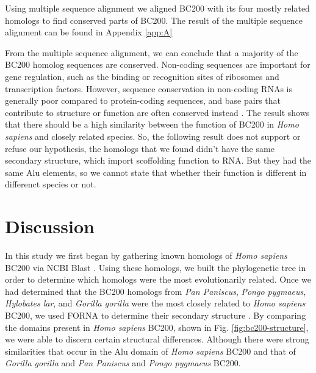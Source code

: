\documentclass[conference, 11pt]{IEEEtran}
\begin{document}
{Using multiple sequence alignment we aligned BC200 with its four mostly related homologs to find conserved parts of BC200. 
The result of the multiple sequence alignment can be found in Appendix \ref{app:A}

From the multiple sequence alignment, we can conclude that a majority of the BC200 homolog sequences are conserved. 
Non-coding sequences are important for gene regulation, such as the binding or recognition sites of ribosomes and transcription factors. 
However, sequence conservation in non-coding RNAs is generally poor compared to protein-coding sequences, and base pairs that contribute to structure or function are often conserved instead \cite{johnsson2014evolutionary}. 
The result shows that there should be a high similarity between the function of BC200 in \emph{Homo sapiens} and closely related species. 
So, the following result does not support or refuse our hypothesis, the homologs that we found didn't have the same secondary structure, which import scoffolding function to RNA. But they had the same Alu elements, so we cannot state that whether their function is different in differenct species or not. 

\section{Discussion}\label{sec:discussion}

In this study we first began by gathering known homologs of \emph{Homo sapiens} BC200 via NCBI Blast \cite{blastTool,madden2012blast}. 
Using these homologs, we built the phylogenetic tree in order to determine which homologs were the most evolutionarily related. 
Once we had determined that the BC200 homologs from \emph{Pan Paniscus}, \emph{Pongo pygmaeus}, \emph{Hylobates lar}, and \emph{Gorilla gorilla} were the most closely related to \emph{Homo sapiens} BC200, we used FORNA to determine their secondary structure \cite{lorenz2011viennarna}. 
By comparing the domains present in \emph{Homo sapiens} BC200, shown in Fig. \ref{fig:bc200-structure}, we were able to discern certain structural differences. 
Although there were strong similarities that occur in the Alu domain of \emph{Homo sapiens} BC200 and that of \emph{Gorilla gorilla} and \emph{Pan Paniscus} and \emph{Pongo pygmaeus} BC200. 

}
\end{document}
